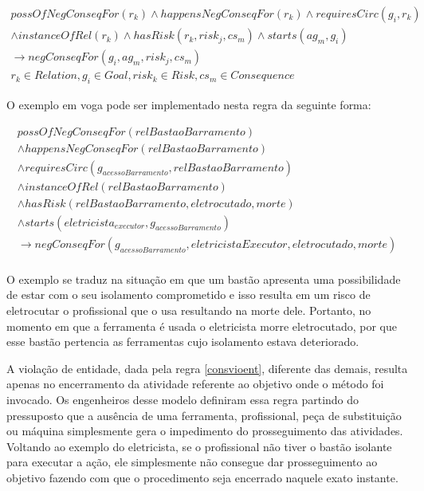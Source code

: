 \begin{eqnarray}\label{paybutiamnotguilty}
	possOfNegConseqFor(r_k) \wedge  happensNegConseqFor(r_k) \wedge requiresCirc(g_i,r_k) \nonumber \\ 
	\wedge instanceOfRel(r_k) \wedge hasRisk(r_k,risk_j,cs_m) \wedge starts(ag_m,g_i) \nonumber \\ 
	\to negConseqFor(g_i,ag_m,risk_j,cs_m) \nonumber \\ 
    r_k \in Relation, g_i \in Goal, risk_k \in Risk, cs_m \in Consequence
\end{eqnarray}

O exemplo em voga pode ser implementado nesta regra da seguinte forma: 

\begin{eqnarray}\nonumber
   possOfNegConseqFor(relBastaoBarramento) \nonumber \\
    \wedge happensNegConseqFor(relBastaoBarramento) \nonumber \\ 
    \wedge requiresCirc(g_{acessoBarramento},relBastaoBarramento) \nonumber \\  
    \wedge instanceOfRel(relBastaoBarramento) \nonumber \\ 
    \wedge hasRisk(relBastaoBarramento,eletrocutado,morte) \nonumber \\  
    \wedge starts(eletricista_{executor},g_{acessoBarramento}) \nonumber \\ 
    \to negConseqFor(g_{acessoBarramento},eletricistaExecutor,eletrocutado,morte) \\ \nonumber
\end{eqnarray}

O exemplo se traduz na situação em que um bastão apresenta uma possibilidade de estar com o seu isolamento comprometido e isso resulta em um risco de eletrocutar o profissional que o usa resultando na morte dele. Portanto, no momento em que a ferramenta é usada o eletricista morre eletrocutado, por que esse bastão pertencia as ferramentas cujo isolamento estava deteriorado. 

A violação de entidade, dada pela regra \ref{consvioent}, diferente das demais, resulta apenas no encerramento da atividade referente ao objetivo onde o método foi invocado. Os engenheiros desse modelo definiram essa regra partindo do pressuposto que a ausência de uma ferramenta, profissional, peça de substituição ou máquina simplesmente gera o impedimento do prosseguimento das atividades. Voltando ao exemplo do eletricista, se o profissional não tiver o bastão isolante para executar a ação, ele simplesmente não consegue dar prosseguimento ao objetivo fazendo com que o procedimento seja encerrado naquele exato instante. 

